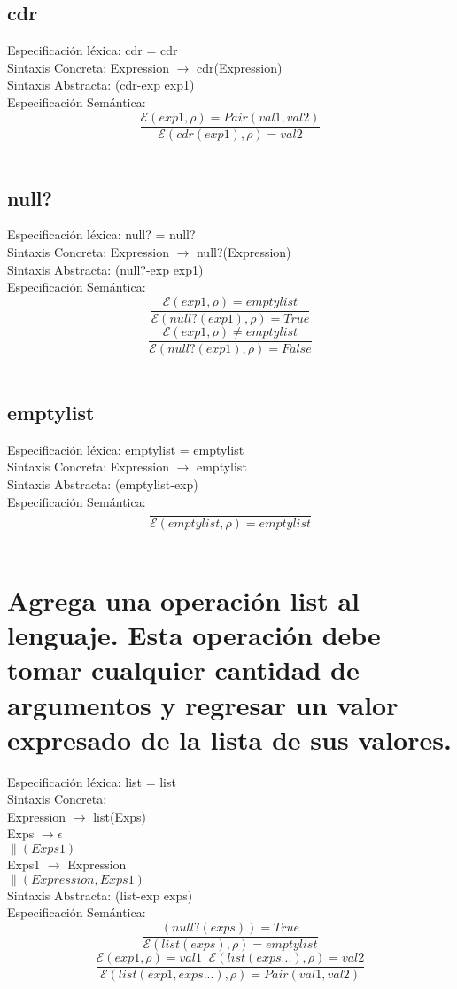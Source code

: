 \documentclass{article}
\begin{document}
\subsection{cdr}
Especificación léxica:
cdr = cdr
\\
Sintaxis Concreta:
Expression $\rightarrow$ cdr(Expression)
\\
Sintaxis Abstracta:
(cdr-exp exp1)
\\
Especificación Semántica:
$$\frac{\mathcal{E} (exp1, \rho) = Pair(val1, val2)}{\mathcal{E} (cdr(exp1), \rho ) = val2}$$
\\
\subsection{null?}
Especificación léxica:
null? = null?
\\
Sintaxis Concreta:
Expression $\rightarrow$ null?(Expression)
\\
Sintaxis Abstracta:
(null?-exp exp1)
\\
Especificación Semántica:
$$\frac{\mathcal{E} (exp1, \rho) = emptylist}{\mathcal{E} (null?(exp1), \rho ) = True}$$
$$\frac{\mathcal{E} (exp1, \rho) \neq emptylist}{\mathcal{E} (null?(exp1), \rho ) = False}$$
\\
\subsection{emptylist}
Especificación léxica:
emptylist = emptylist
\\
Sintaxis Concreta:
Expression $\rightarrow$ emptylist
\\
Sintaxis Abstracta:
(emptylist-exp)
\\
Especificación Semántica:
$$\frac{}{\mathcal{E} (emptylist, \rho ) = emptylist}$$
\\

\section{Agrega una operación list al lenguaje. Esta operación debe tomar cualquier cantidad de
argumentos y regresar un valor expresado de la lista de sus valores.}
Especificación léxica:
list = list
\\
Sintaxis Concreta:
\\
Expression $\rightarrow$ list(Exps)
\\
Exps $\rightarrow \epsilon$
\\
$\|(Exps1)$
\\
Exps1 $\rightarrow$ Expression
\\
$\|(Expression, Exps1)$
\\
Sintaxis Abstracta:
(list-exp exps)
\\
Especificación Semántica:
$$\frac{(null? (exps)) = True}{\mathcal{E} (list(exps), \rho ) = emptylist}$$
$$\frac{\mathcal{E} (exp1, \rho) = val1 \;\; \mathcal{E}(list(exps...), \rho )= val2}{\mathcal{E} (list(exp1,exps...), \rho ) = Pair(val1, val2)}$$
\\
\end{document}
